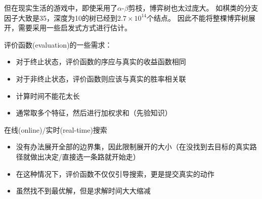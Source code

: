 但在现实生活的游戏中，即使采用了$\alpha$-$\beta$剪枝，博弈树也太过庞大。
如棋类的分支因子大致是35，深度为10的树已经到$2.7\times 10^{14}$个结点。
因此不能将整棵博弈树展开，需要采用一些启发式方式进行估计。

评价函数(evaluation)的一些需求：
\begin{itemize}
	\item 对于终止状态，评价函数的序应与真实的收益函数相同
	\item 对于非终止状态，评价函数则应该与真实的胜率相关联
	\item 计算时间不能花太长
	\item 通常取多个特征，然后进行加权求和（先验知识）
\end{itemize}

在线(online)/实时(real-time)搜索
\begin{itemize}
	\item 没有办法展开全部的边界集，因此限制展开的大小（在没找到去目标的真实路径就做出决定/直接选一条路就开始走）
	\item 在这种情况下，评价函数不仅仅引导搜索，更是提交真实的动作
	\item 虽然找不到最优解，但是求解时间大大缩减
\end{itemize}